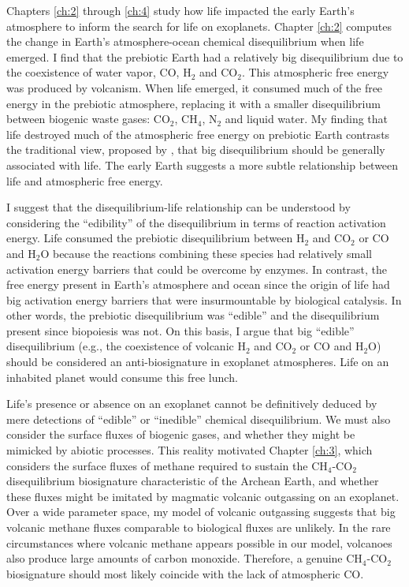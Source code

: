 Chapters \ref{ch:2} through \ref{ch:4} study how life impacted the early Earth's atmosphere to inform the search for life on exoplanets. Chapter \ref{ch:2} computes the change in Earth's atmosphere-ocean chemical disequilibrium when life emerged. I find that the prebiotic Earth had a relatively big disequilibrium due to the coexistence of water vapor, CO, H$_2$ and CO$_2$. This atmospheric free energy was produced by volcanism. When life emerged, it consumed much of the free energy in the prebiotic atmosphere, replacing it with a smaller disequilibrium between biogenic waste gases: CO$_2$, CH$_4$, N$_2$ and liquid water. My finding that life destroyed much of the atmospheric free energy on prebiotic Earth contrasts the traditional view, proposed by \citet{Lovelock_1965}, that big disequilibrium should be generally associated with life. The early Earth suggests a more subtle relationship between life and atmospheric free energy.

I suggest that the disequilibrium-life relationship can be understood by considering the ``edibility'' of the disequilibrium in terms of reaction activation energy. Life consumed the prebiotic disequilibrium between H$_2$ and CO$_2$ or CO and H$_2$O because the reactions combining these species had relatively small activation energy barriers that could be overcome by enzymes. In contrast, the free energy present in Earth's atmosphere and ocean since the origin of life had big activation energy barriers that were insurmountable by biological catalysis. In other words, the prebiotic disequilibrium was ``edible'' and the disequilibrium present since biopoiesis was not. On this basis, I argue that big ``edible'' disequilibrium (e.g., the coexistence of volcanic H$_2$ and CO$_2$ or CO and H$_2$O) should be considered an anti-biosignature in exoplanet atmospheres. Life on an inhabited planet would consume this free lunch.

Life's presence or absence on an exoplanet cannot be definitively deduced by mere detections of ``edible'' or ``inedible'' chemical disequilibrium. We must also consider the surface fluxes of biogenic gases, and whether they might be mimicked by abiotic processes. This reality motivated Chapter \ref{ch:3}, which considers the surface fluxes of methane required to sustain the CH$_4$-CO$_2$ disequilibrium biosignature characteristic of the Archean Earth, and whether these fluxes might be imitated by magmatic volcanic outgassing on an exoplanet. Over a wide parameter space, my model of volcanic outgassing suggests that big volcanic methane fluxes comparable to biological fluxes are unlikely. In the rare circumstances where volcanic methane appears possible in our model, volcanoes also produce large amounts of carbon monoxide. Therefore, a genuine CH$_4$-CO$_2$ biosignature should most likely coincide with the lack of atmospheric CO.

